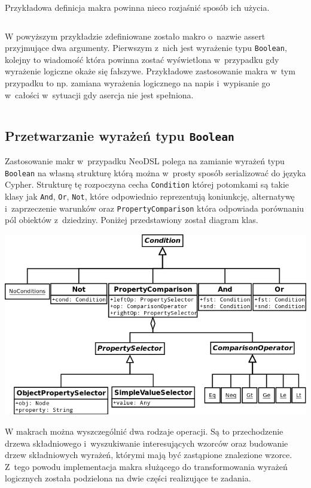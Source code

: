 \documentclass[brudnopis]{xmgr}
\begin{document}
\medskip\noindent Przykładowa definicja makra powinna nieco rozjaśnić sposób ich użycia.

\inputminted{scala}{listings/scala/macro-sample.scala}

W powyższym przykładzie zdefiniowane zostało makro o~nazwie assert przyjmujące dwa argumenty. Pierwszym z~nich jest wyrażenie typu \texttt{Boolean}, kolejny to wiadomość która powinna zostać wyświetlona w~przypadku gdy wyrażenie logiczne okaże się fałszywe. Przykładowe zastosowanie makra w~tym przypadku to np. zamiana wyrażenia logicznego na napis i~wypisanie go w~całości w~sytuacji gdy asercja nie jest spełniona.

\inputminted{scala}{listings/scala/macro-usage-assert.scala}

\newpage

\subsection{Przetwarzanie wyrażeń typu \texttt{Boolean}}

Zastosowanie makr w~przypadku NeoDSL polega na zamianie wyrażeń typu \texttt{Boolean} na własną strukturę którą można w~prosty sposób serializować do języka Cypher. 
Strukturę tę rozpoczyna cecha \texttt{Condition} której potomkami są takie klasy jak \texttt{And}, \texttt{Or}, \texttt{Not}, które odpowiednio reprezentują koniunkcję, alternatywę i~zaprzeczenie warunków oraz \texttt{PropertyComparison} która odpowiada porównaniu pól obiektów z~dziedziny. Poniżej przedstawiony został diagram klas.

\includegraphics[scale=0.5]{images/conditions-uml.png}

W makrach można wyszczególnić dwa rodzaje operacji. Są to przechodzenie drzewa składniowego i~wyszukiwanie interesujących wzorców oraz budowanie drzew składniowych wyrażeń, którymi mają być zastąpione znalezione wzorce. Z~tego powodu implementacja makra służącego do transformowania wyrażeń logicznych została podzielona na dwie części realizujące te zadania.
\end{document}
